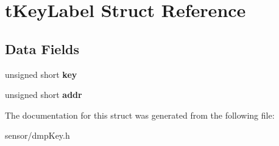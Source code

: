 \hypertarget{structt_key_label}{}\section{t\+Key\+Label Struct Reference}
\label{structt_key_label}
\subsection*{Data Fields}
\begin{DoxyCompactItemize}
\item 
unsigned short {\bfseries key}\hypertarget{structt_key_label_ad42a2de4cc8381513f980278161372bb}{}\label{structt_key_label_ad42a2de4cc8381513f980278161372bb}

\item 
unsigned short {\bfseries addr}\hypertarget{structt_key_label_af2d98bb0b152ca3d254d1c534236c2e6}{}\label{structt_key_label_af2d98bb0b152ca3d254d1c534236c2e6}

\end{DoxyCompactItemize}


The documentation for this struct was generated from the following file\+:\begin{DoxyCompactItemize}
\item 
sensor/dmp\+Key.\+h\end{DoxyCompactItemize}
